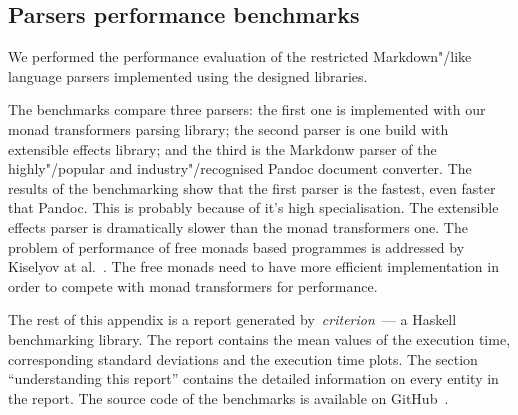 \begin{appendices}

\chapter{Parsers performance benchmarks}

We performed the performance evaluation of the restricted Markdown"/like language parsers
implemented using the designed libraries.

The benchmarks compare three parsers: the first one is implemented with our monad
transformers parsing library; the second parser is one build with extensible effects
library; and the third is the Markdonw parser of the highly"/popular and
industry"/recognised Pandoc document converter. The results of the benchmarking show
that the first parser is the fastest, even faster that Pandoc. This is probably because of
it's high specialisation. The extensible effects parser is dramatically slower than
the monad transformers one. The problem of performance of free monads based programmes
is addressed by Kiselyov at al.~\cite{Kiselyov:2015:FMM:2887747.2804319}.
The free monads need to have more efficient implementation in order to
compete with monad transformers for performance.

The rest of this appendix is a report generated by~\emph{criterion}~---
a Haskell benchmarking library. The report contains the mean values of the
execution time, corresponding standard deviations and the execution time plots.
The section ``understanding this report'' contains the detailed information on
every entity in the report. The source code of the benchmarks is available on
GitHub~\cite{parsers-benchmarks}.



\end{appendices}